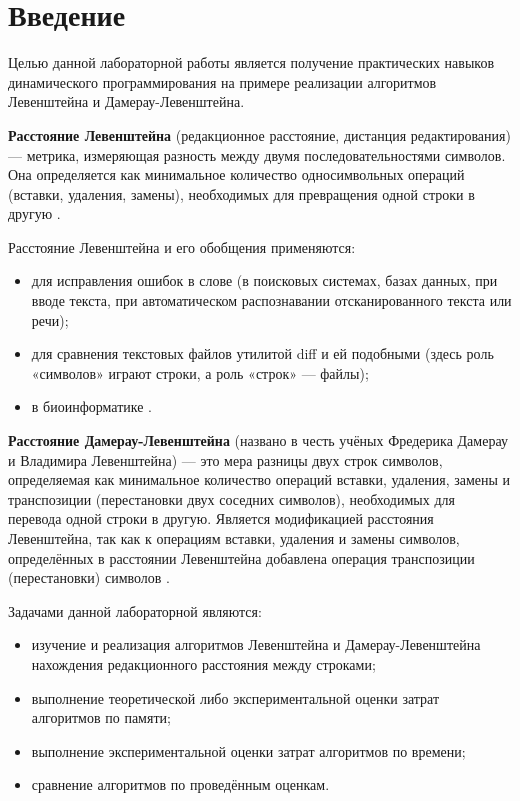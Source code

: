 \chapter*{Введение}

Целью данной лабораторной работы является получение практических навыков динамического программирования на примере реализации алгоритмов Левенштейна и Дамерау-Левенштейна.

\textbf{Расстояние Левенштейна}  (редакционное расстояние, дистанция редактирования) --- метрика, измеряющая разность между двумя последовательностями символов. Она определяется как минимальное количество односимвольных операций (вставки, удаления, замены), необходимых для превращения одной строки в другую \cite{Levenshtein}. 

Расстояние Левенштейна и его обобщения применяются:
\begin{itemize}
	\item для исправления ошибок в слове (в поисковых системах, базах данных, при вводе текста, при автоматическом распознавании отсканированного текста или речи);
	\item для сравнения текстовых файлов утилитой diff и ей подобными (здесь роль «символов» играют строки, а роль «строк» --- файлы);
	\item в биоинформатике \cite{Bioinf}. 
\end{itemize}

\textbf{Расстояние Дамерау-Левенштейна} (названо в честь учёных Фредерика Дамерау и Владимира Левенштейна) --- это мера разницы двух строк символов, определяемая как минимальное количество операций вставки, удаления, замены и транспозиции (перестановки двух соседних символов), необходимых для перевода одной строки в другую. Является модификацией расстояния Левенштейна, так как к операциям вставки, удаления и замены символов, определённых в расстоянии Левенштейна добавлена операция транспозиции (перестановки) символов \cite{DamLevenshtein}. 

Задачами данной лабораторной являются:
\begin{itemize}
	\item изучение и реализация алгоритмов Левенштейна и Дамерау-Левенштейна нахождения редакционного расстояния между строками;
	\item выполнение теоретической либо экспериментальной оценки затрат алгоритмов по памяти;
	\item выполнение экспериментальной оценки затрат алгоритмов по времени;
	\item сравнение алгоритмов по проведённым оценкам.
\end{itemize}

